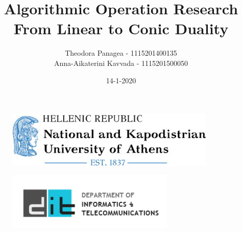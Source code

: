 \documentclass[12pt]{article}
\title{Algorithmic Operation Research \\ From Linear to Conic Duality}
\date{14-1-2020}
\author{Theodora Panagea - 1115201400135 \\ Anna-Aikaterini Kavvada - 1115201500050}
\begin{document}
\begin{figure}
    \centering
    \includegraphics[width=10cm]{nkua.png}
    
\end{figure}
       
\begin{figure}

    \centering
    \includegraphics[width=8cm]{dit.png}
\end{figure}

\maketitle{}
\begin{center}

\end{center}
  	\newpage
  	\tableofcontents
  	\newpage
  	
\end{document}
